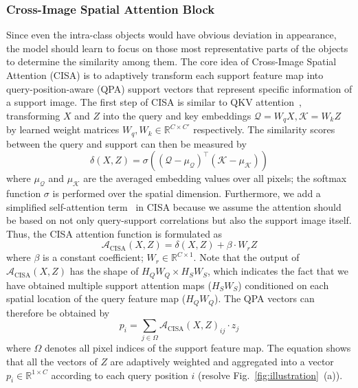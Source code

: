 \documentclass[journal]{IEEEtran}
\begin{document}
\subsubsection{Cross-Image Spatial Attention Block}
\label{section:method_cisa}
Since even the intra-class objects would have obvious deviation in appearance, the model should learn to focus on those most representative parts of the objects to determine the similarity among them.
The core idea of Cross-Image Spatial Attention (CISA) is to adaptively transform each support feature map into query-position-aware (QPA) support vectors that represent specific information of a support image.
The first step of CISA is similar to QKV attention~\cite{vaswani2017attention}, transforming $X$ and $Z$ into the query and key embeddings $\mathcal{Q}=W_{q}X, \mathcal{K} = W_{k}Z$ by learned weight matrices $W_q, W_k\in\mathbb{R}^{C\times C'}$ respectively.
The similarity scores between the query and support can then be measured by
\begin{equation} \label{eq:delta_in_dana}
    \delta(X, Z) = \sigma( (\mathcal{Q} - \mu_{\mathcal{Q}})^\top (\mathcal{K} - \mu_{\mathcal{K}}))
\end{equation}
where $\mu_{\mathcal{Q}}$ and $\mu_{\mathcal{K}}$ are the averaged embedding values over all pixels; the softmax function $\sigma$ is performed over the spatial dimension.
Furthermore, we add a simplified self-attention term~\cite{cao2019gcnet} in CISA because we assume the attention should be based on not only query-support correlations but also the support image itself.
Thus, the CISA attention function is formulated as
\begin{equation} \label{eq:attention_in_dana}
    \mathcal{A}_\text{CISA}(X, Z) = \delta (X, Z) + \beta \cdot W_r Z
\end{equation}
where $\beta$ is a constant coefficient; $W_r\in\mathbb{R}^{C\times 1}$.
Note that the output of $\mathcal{A}_\text{CISA}(X, Z)$ has the shape of $H_Q W_Q\times H_S W_S$, which indicates the fact that we have obtained multiple support attention maps ($H_S W_S$) conditioned on each spatial location of the query feature map ($H_Q W_Q$).
The QPA vectors can therefore be obtained by
\begin{equation} \label{eq:qpa_in_dana}
p_i = \sum_{j\in \Omega}  \mathcal{A}_\text{CISA}(X, Z)_{ij} \cdot z_j
\end{equation}
where $\Omega$ denotes all pixel indices of the support feature map.
The equation shows that all the vectors of $Z$ are adaptively weighted and aggregated into a vector $p_i\in\mathbb{R}^{1\times C}$ according to each query position $i$ (resolve Fig.~\ref{fig:illustration}~(a)).
\end{document}
